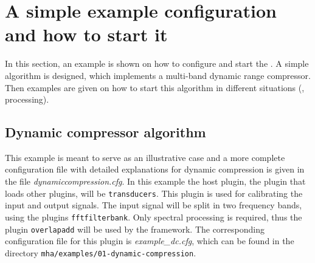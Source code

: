 
\section{A simple example configuration and how to start it}%
\label{sec:scenarios}%
%
%
%

In this section, an example is shown on how to configure and start the
\mha{}. A simple algorithm is designed, which implements a 
multi-band dynamic range compressor. Then examples are given on
how to start this algorithm in different situations (\mhad{}, \Matlab{} processing).

\subsection{Dynamic compressor algorithm}%
\label{sec:dyncmp}%

This example is meant to serve as an illustrative case and a more complete 
configuration file with detailed explanations for dynamic compression is given 
in the file \newline \emph{dynamiccompression.cfg}.
%
In this example the host plugin, the plugin that loads other plugins, 
will be \verb!transducers!. This plugin is used for calibrating the 
input and output signals.
%
The input signal will be split in two frequency bands, using the \mha{}
plugins \verb!fftfilterbank!. Only spectral processing is required, thus
the plugin \verb!overlapadd! will be
used by the framework. The corresponding configuration file for this
plugin is \emph{example\_dc.cfg}, which can be found in
the directory \verb!mha/examples/01-dynamic-compression!.

